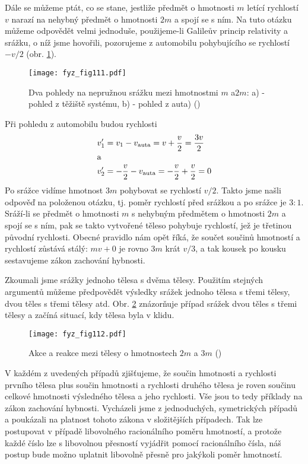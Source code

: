    Dále se můžeme ptát, co se stane, jestliže předmět o hmotnosti \(m\) letící rychlostí \(v\) 
    narazí na nehybný předmět o hmotnosti \(2m\) a spojí se s ním. Na tuto otázku můžeme odpovědět 
    velmi jednoduše, použijeme-li Galileův princip relativity a srážku, o níž jsme hovořili, 
    pozorujeme z automobilu pohybujícího se rychlostí \(-v/2\) (obr. \ref{fyz:fig111}).

    \begin{figure}[ht!]  %
      \centering
      \texttt{[image: fyz\_fig111.pdf]}
      \caption{Dva pohledy na nepružnou srážku mezi hmotnostmi \(m\) a\(2m\): a) - pohled z těžiště 
              systému, b) - pohled z auta)
              (\cite[s.~146]{Feynman01})}
      \label{fyz:fig111}
    \end{figure}
    Při pohledu z automobilu budou rychlosti
    \begin{align*}
      v_1' &= v_1 - v_{\text{auta}} = v + \frac{v}{2} = \frac{3v}{2}   \\
      \shortintertext{a}
      v_2' &= -\frac{v}{2} - v_{\text{auta}} = - \frac{v}{2} + \frac{v}{2} = 0
    \end{align*}
    Po srážce vidíme hmotnost \(3m\) pohybovat se rychlostí \(v/2\). Takto jsme našli odpověď na 
    položenou otázku, tj. poměr rychlostí před srážkou a po srážce je \(3:1\). Sráží-li se předmět 
    o hmotnosti \(m\) s nehybným předmětem o hmotnosti \(2m\) a spojí se s ním, pak se takto 
    vytvořené těleso pohybuje rychlostí, jež je třetinou původní rychlosti. Obecné pravidlo nám 
    opět říká, že součet součinů hmotností a rychlostí zůstává stálý: \(mv + 0\) je rovno \(3m\) 
    krát \(v/3\), a tak kousek po kousku sestavujeme zákon zachování hybnosti.
    
    Zkoumali jsme srážky jednoho tělesa s dvěma tělesy. Použitím stejných argumentů můžeme 
    předpovědět výsledky srážek jednoho tělesa s třemi tělesy, dvou těles s třemi tělesy atd. Obr. 
    \ref{fyz:fig112} znázorňuje případ srážek dvou těles s třemi tělesy a začíná situací, kdy 
    tělesa byla v klidu.
    
    \begin{figure}[ht!]  %
      \centering
      \texttt{[image: fyz\_fig112.pdf]}
      \caption{Akce a reakce mezi tělesy o hmotnostech \(2m\) a \(3m\)
              (\cite[s.~147]{Feynman01})}
      \label{fyz:fig112}
    \end{figure}
    V každém z uvedených případů zjišťujeme, že součin hmotnosti a rychlosti prvního tělesa plus 
    součin hmotnosti a rychlosti druhého tělesa je roven součinu celkové hmotnosti výsledného 
    tělesa a jeho rychlosti. Vše jsou to tedy příklady na zákon zachování hybnosti. Vycházeli jsme 
    z jednoduchých, symetrických případů a poukázali na platnost tohoto zákona v složitějších 
    případech. Tak lze postupovat v případě libovolného racionálního poměru hmotností, a protože 
    každé číslo lze s libovolnou přesností vyjádřit pomocí racionálního čísla, náš postup bude 
    možno uplatnit libovolně přesně pro jakýkoli poměr hmotností.
     
